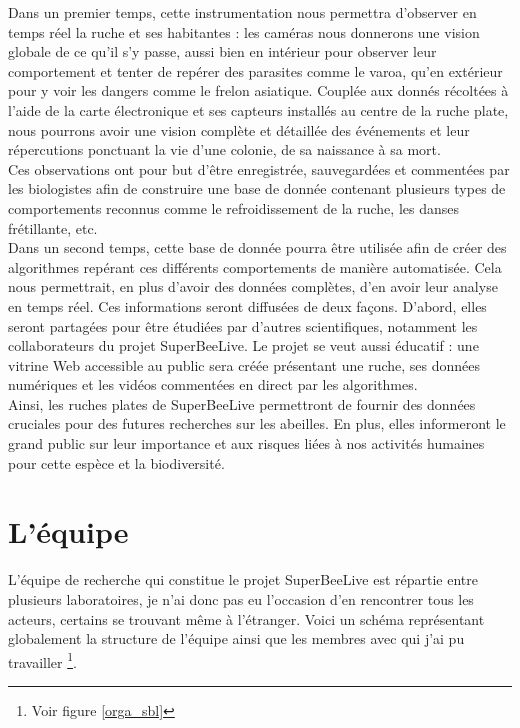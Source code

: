 \documentclass[11pt,french,a4paper]{report}
\begin{document}
Dans un premier temps, cette instrumentation nous permettra d'observer en temps réel la ruche et ses habitantes : 
les caméras nous donnerons une vision globale de ce qu'il s'y passe, aussi bien en intérieur pour observer leur 
comportement et tenter de repérer des parasites comme le varoa, qu'en extérieur pour y voir les dangers comme le frelon asiatique. %
Couplée aux donnés récoltées à l'aide de la carte électronique et ses capteurs installés au centre de la ruche plate, 
nous pourrons avoir une vision complète et détaillée des événements et leur répercutions ponctuant la vie d'une colonie,
de sa naissance à sa mort. \\
Ces observations ont pour but d'être enregistrée, sauvegardées et commentées par les biologistes afin de construire une base
de donnée contenant plusieurs types de comportements reconnus comme le refroidissement de la ruche, les danses frétillante, etc. %
\\
Dans un second temps, cette base de donnée pourra être utilisée afin de créer des algorithmes repérant ces différents comportements
de manière automatisée. Cela nous permettrait, en plus d'avoir des données complètes, d'en avoir leur analyse en 
temps réel. Ces informations seront diffusées de deux façons. D'abord, elles seront partagées pour être étudiées par d'autres scientifiques, 
notamment les collaborateurs du projet SuperBeeLive. Le projet se veut aussi éducatif : une vitrine Web accessible au public 
sera créée présentant une ruche, ses données numériques et les vidéos commentées en direct par les algorithmes. \\


Ainsi, les ruches plates de SuperBeeLive permettront de fournir des données cruciales pour des futures recherches sur les 
abeilles. En plus, elles informeront le grand public sur leur importance et aux risques liées à nos activités humaines pour 
cette espèce et la biodiversité. 


\section{L'équipe}
L'équipe de recherche qui constitue le projet SuperBeeLive est répartie entre plusieurs laboratoires, je n'ai donc pas eu l'occasion
d'en rencontrer tous les acteurs, certains se trouvant même à l'étranger. Voici un schéma représentant globalement la structure
de l'équipe ainsi que les membres avec qui j'ai pu travailler \footnote{ Voir figure \ref{orga_sbl} }. \\
\end{document}
